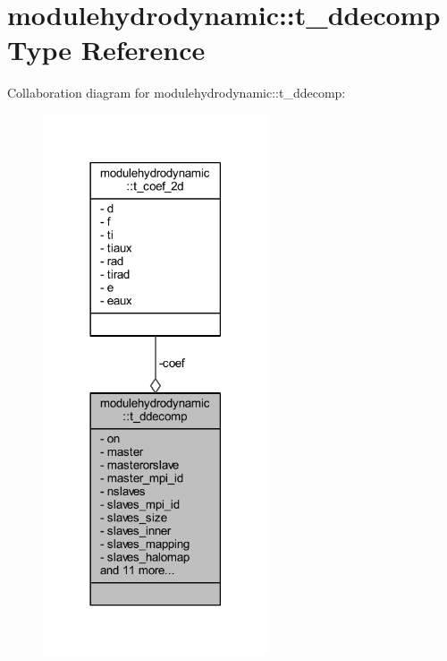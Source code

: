 \hypertarget{structmodulehydrodynamic_1_1t__ddecomp}{}\section{modulehydrodynamic\+:\+:t\+\_\+ddecomp Type Reference}
\label{structmodulehydrodynamic_1_1t__ddecomp}


Collaboration diagram for modulehydrodynamic\+:\+:t\+\_\+ddecomp\+:\nopagebreak
\begin{figure}[H]
\begin{center}
\leavevmode
\includegraphics[width=189pt]{structmodulehydrodynamic_1_1t__ddecomp__coll__graph}
\end{center}
\end{figure}
